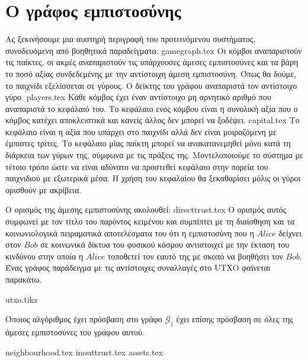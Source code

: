 \section{Ο γράφος εμπιστοσύνης}
  Ας ξεκινήσουμε μια αυστηρή περιγραφή του προτεινόμενου συστήματος, συνοδευόμενη από βοηθητικά παραδείγματα.
  {gamegraph.tex}
  Οι κόμβοι αναπαριστούν τις παίκτες, οι ακμές αναπαριστούν τις υπάρχουσες άμεσες εμπιστοσύνες και τα βάρη το ποσό αξίας
  συνδεδεμένης με την αντίστοιχη άμεση εμπιστοσύνη. Όπως θα δούμε, το παιχνίδι εξελίσσεται σε γύρους. Ο δείκτης του γράφου
  αναπαριστά τον αντίστοιχο γύρο.
  {players.tex}
  Κάθε κόμβος έχει έναν αντίστοιχο μη αρνητικό αριθμό που αναπαριστά το κεφάλαιό του. Το κεφάλαιο ενός κόμβου είναι η συνολική
  αξία που ο κόμβος κατέχει αποκλειστικά και κανείς άλλος δεν μπορεί να ξοδέψει.
  {capital.tex}
  Το κεφάλαιο είναι η αξία που υπάρχει στο παιχνίδι αλλά δεν είναι μοιραζόμενη με έμπιστες τρίτες. Το κεφάλαιο μίας παίκτη
  μπορεί να ανακατανεμηθεί μόνο κατά τη διάρκεια των γύρων της, σύμφωνα με τις πράξεις της. Μοντελοποιούμε το σύστημα με
  τέτοιο τρόπο ώστε να είναι αδύνατο να προστεθεί κεφάλαιο στην πορεία του παιχνιδιού με εξωτερικά μέσα. Η χρήση του κεφαλαίου
  θα ξεκαθαρίσει μόλις οι γύροι ορισθούν με ακρίβεια.

  Ο ορισμός της άμεσης εμπιστοσύνης ακολουθεί:
  {directtrust.tex}
  Ο ορισμός αυτός συμφωνεί με τον τίτλο του παρόντος κειμένου και συμπίπτει με τη διαίσθηση και τα κοινωνιολογικά πειραματικά
  αποτελέσματα του \cite{kmrs} ότι η εμπιστοσύνη που η $Alice$ δείχνει στον $Bob$ σε κοινωνικά δίκτυα του φυσικού κόσμου
  αντιστοιχεί με την έκταση του κινδύνου στην οποία η $Alice$ τοποθετεί τον εαυτό της με σκοπό να βοηθήσει τον $Bob$. Ένας
  γράφος παράδειγμα με τις αντίστοιχες συναλλαγές στο \textlatin{UTXO} φαίνεται παρακάτω.

  {utxo.tikz}

  Όποιος αλγόριθμος έχει πρόσβαση στο γράφο $\mathcal{G}_j$ έχει επίσης πρόσβαση σε όλες της άμεσες εμπιστοσύνες του γράφου
  αυτού.

  {neighbourhood.tex}
  {inouttrust.tex}
  {assets.tex}
